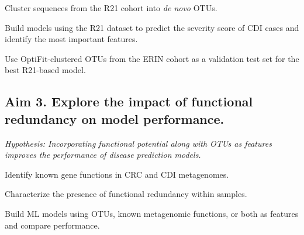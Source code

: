 \documentclass[11pt]{article}
\begin{document}
\begin{compactenum}[A.]
    \item Cluster sequences from the R21 cohort into \textit{de novo} OTUs.
    \item Build models using the R21 dataset to predict the severity score of CDI cases and identify the most important features.
    \item Use OptiFit-clustered OTUs from the ERIN cohort as a validation test set for the best R21-based model.
\end{compactenum}

\subsection*{Aim 3. Explore the impact of functional redundancy on model performance.}
\textit{Hypothesis: Incorporating functional potential along with OTUs as features improves the performance of disease prediction models.}

\begin{compactenum}[A.]
    \item Identify known gene functions in CRC and CDI metagenomes.
    \item Characterize the presence of functional redundancy within samples.
    \item Build ML models using OTUs, known metagenomic functions, or both as features and compare performance.
\end{compactenum}
\end{document}
